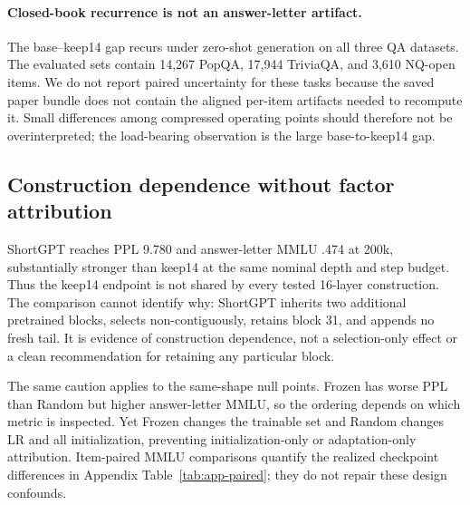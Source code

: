 \paragraph{Closed-book recurrence is not an answer-letter artifact.}
The base--keep14 gap recurs under zero-shot generation on all three QA datasets.
The evaluated sets contain 14,267 PopQA, 17,944 TriviaQA, and 3,610 NQ-open
items. We do not report paired uncertainty for these tasks because the saved
paper bundle does not contain the aligned per-item artifacts needed to
recompute it. Small differences among compressed operating points should
therefore not be overinterpreted; the load-bearing observation is the large
base-to-keep14 gap.

\subsection{Construction dependence without factor attribution}
ShortGPT reaches PPL 9.780 and answer-letter MMLU .474 at 200k, substantially
stronger than keep14 at the same nominal depth and step budget. Thus the
keep14 endpoint is not shared by every tested 16-layer construction. The
comparison cannot identify why: ShortGPT inherits two additional pretrained
blocks, selects non-contiguously, retains block 31, and appends no fresh tail.
It is evidence of construction dependence, not a selection-only effect or a
clean recommendation for retaining any particular block.

The same caution applies to the same-shape null points. Frozen has worse PPL
than Random but higher answer-letter MMLU, so the ordering depends on which
metric is inspected. Yet Frozen changes the trainable set and Random changes
LR and all initialization, preventing initialization-only or adaptation-only
attribution. Item-paired MMLU comparisons quantify the realized checkpoint
differences in Appendix Table~\ref{tab:app-paired}; they do not repair these
design confounds.
